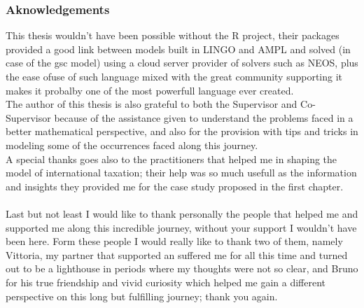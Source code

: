 \begin{doublespace}
\subsubsection{Aknowledgements}
This thesis wouldn't have been possible without the R project, their packages provided a good link between models built in LINGO and AMPL\cite{Fourer1997} and solved (in case of the \gls{gsc} model) using a cloud server provider of solvers such as NEOS, plus the ease ofuse of such language mixed with the great community supporting it makes it probalby one of the most powerfull language ever created. 
\\
The author of this thesis is also grateful to both the Supervisor and Co-Supervisor because of the assistance given to understand the problems faced in a better mathematical perspective, and also for the provision with tips and tricks in modeling some of the occurrences faced along this journey.
\\
A special thanks goes also to the practitioners that helped me in shaping the model of international taxation; their help was so much usefull as the information and insights they provided me for the case study proposed in the first chapter.
\\
\\
Last but not least I would like to thank personally the people that helped me and supported me along this incredible journey, without your support I wouldn't have been here. Form these people I would really like to thank two of them, namely Vittoria, my partner that supported an suffered me for all this time and turned out to be a lighthouse in periods where my thoughts were not so clear, and Bruno for his true friendship and vivid curiosity which helped me gain a different perspective on this long but fulfilling journey; thank you again.

\end{doublespace}

\clearpage{\pagestyle{empty}\cleardoublepage}
